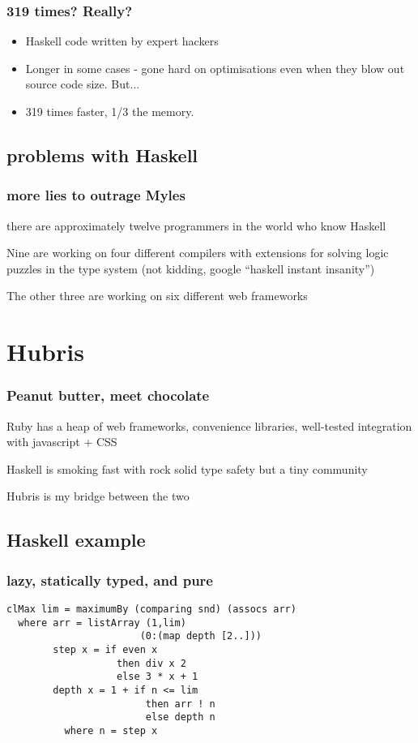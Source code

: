 \documentclass{beamer}
\begin{document}
\begin{frame}
  \frametitle{319 times? Really?}
  \begin{itemize}
  \item<1-> Haskell code written by expert hackers
  \item<2-> Longer in some cases - gone hard on optimisations
    even when they blow out source code size. But...
  \item <3-> 319 times faster, 1/3 the memory.
  \end{itemize}
\end{frame}

\subsection{problems with Haskell}
\begin{frame}
\frametitle{more lies to outrage Myles}
\setlength\parskip{0.1in}
there are approximately twelve programmers in the world who know Haskell

Nine are working on four different compilers with extensions for
solving logic puzzles in the type system (not kidding, google
``haskell instant insanity'')

The other three are working on six different web frameworks
\end{frame}

\section{Hubris}
\begin{frame}
\frametitle{Peanut butter, meet chocolate}
Ruby has a heap of web frameworks, convenience libraries, well-tested
integration with javascript + CSS
\setlength\parskip{0.25in}

Haskell is smoking fast with rock solid type safety but a tiny
community

Hubris is my bridge between the two
\end{frame}

\subsection{Haskell example}
\begin{frame}[fragile]
  \frametitle{lazy, statically typed, and pure}
  \begin{lstlisting}
clMax lim = maximumBy (comparing snd) (assocs arr)
  where arr = listArray (1,lim)
                       (0:(map depth [2..]))
        step x = if even x
                   then div x 2
                   else 3 * x + 1
        depth x = 1 + if n <= lim
                        then arr ! n
                        else depth n
          where n = step x
  \end{lstlisting}
\end{frame}
\end{document}
